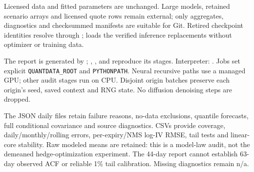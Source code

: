 \documentclass[11pt]{article}
\begin{document}
Licensed data and fitted parameters are unchanged. Large models, retained scenario arrays and licensed quote rows remain external; only aggregates, diagnostics and checksummed manifests are suitable for Git. Retired checkpoint identities resolve through ;  loads the verified inference replacements without optimizer or training data.

The report is generated by ; , ,  and  reproduce its stages. Interpreter: . Jobs set explicit \texttt{QUANTDATA\_ROOT} and \texttt{PYTHONPATH}. Neural recursive paths use a managed GPU; other audit stages run on CPU. Disjoint origin batches preserve each origin's seed, saved context and RNG state. No diffusion denoising steps are dropped.

The JSON daily files retain failure reasons, no-data exclusions, quantile forecasts, full conditional covariance and source diagnostics. CSVs provide coverage, daily/monthly/rolling errors, per-expiry/NMS log-IV RMSE, tail tests and linear-core stability. Raw modeled means are retained: this is a model-law audit, not the demeaned hedge-optimization experiment. The 44-day report cannot establish 63-day observed ACF or reliable 1\% tail calibration. Missing diagnostics remain n/a.


\endgroup
\end{document}

